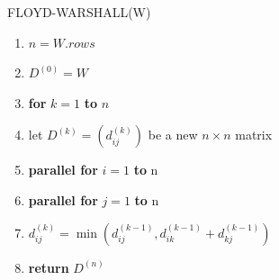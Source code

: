 \documentclass[]{memoir}
\begin{document}
\begin{enumerate}
FLOYD-WARSHALL(W)
\begin{enumerate}[label=\arabic*\hspace{2mm}]
	\item $n = W.rows$	
	\item $D^{(0)} = W$
	\item \textbf{for} $k=1$ \textbf{to} $n$
	\item \hspace{1cm} let $D^{(k)}=\left( d_{ij}^{(k)}\right)$ be a new $n \times n$ matrix
	\item \hspace{1cm} \textbf{parallel for} $i=1$ \textbf{to} n
	\item \hspace{2cm} \textbf{parallel for} $j=1$ \textbf{to} n
	\item \hspace{3cm} $d_{ij}^{(k)}= \min{(d_{ij}^{(k-1)},d_{ik}^{(k-1)} + d_{kj}^{(k-1)})}$
	\item \textbf{return} $D^{(n)}$
\end{enumerate}

\end{enumerate}
\end{document}
